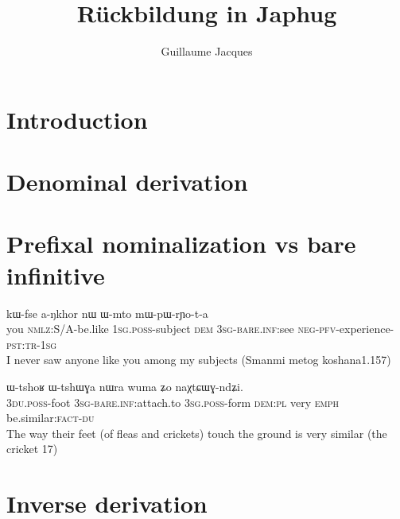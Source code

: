 \documentclass[oldfontcommands,oneside,a4paper,11pt]{article}
\newcommand{\ipa}[1]{{\phon \mbox{#1}}} %
\begin{document}
 
 \title{Rückbildung in Japhug}
\author{Guillaume Jacques}
\maketitle
\sloppy


\section{Introduction}

\section{Denominal derivation}
\citet{jacques12incorp}
\citet{jacques14antipassive}

\section{Prefixal nominalization vs bare infinitive}
\citet{jacques14antipassive}
\begin{exe}
\ex \label{ex:bare.inf}
\gll \ipa{nɤʑo} 	\ipa{kɯ-fse} 	\ipa{a-ŋkhor} 	\ipa{nɯ} 	\ipa{ɯ-mto} 	\ipa{mɯ-pɯ-rɲo-t-a} \\
you \textsc{nmlz:S/A}-be.like \textsc{1sg.poss}-subject \textsc{dem} \textsc{3sg}-\textsc{bare.inf:}see \textsc{neg-pfv}-experience-\textsc{pst:tr-1sg} \\
\glt I never saw anyone like you among my subjects (Smanmi metog koshana1.157)
\end{exe}

\begin{exe}
\ex \label{ex:bare.inf.noun}
\gll \ipa{ndʑi-mi}   	\ipa{ɯ-tshoʁ}   	\ipa{ɯ-tshɯɣa}   	\ipa{nɯra}   	\ipa{wuma}   	\ipa{ʑo}   	\ipa{naχtɕɯɣ-ndʑi.}   \\
\textsc{3du.poss}-foot \textsc{3sg}-\textsc{bare.inf:}attach.to \textsc{3sg.poss}-form \textsc{dem:pl} very \textsc{emph}   be.similar:\textsc{fact}-\textsc{du}  \\
\glt The way their feet (of fleas and crickets) touch the ground is very similar (the cricket 17)
\end{exe}




\section{Inverse derivation}
\citet{garnier15inverse}
\end{document}
